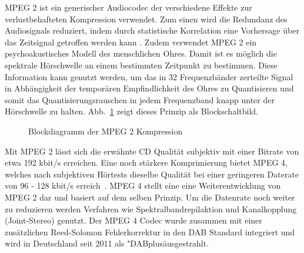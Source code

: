 \ac{MPEG 2} ist ein generischer Audiocodec der verschiedene Effekte zur verlustbehafteten Kompression verwendet. Zum einen wird die Redundanz des Audiosignals reduziert, indem durch statistische Korrelation eine Vorhersage über das Zeitsignal getroffen werden kann \cite{dab_buch}. Zudem verwendet \ac{MPEG 2} ein psychoakustisches Modell des menschlichen Ohres. Damit ist es möglich die spektrale Hörschwelle an einem bestimmten Zeitpunkt zu bestimmen. Diese Information kann genutzt werden, um das in 32 Frequenzbänder zerteilte Signal in Abhängigkeit der temporären Empfindlichkeit des Ohres zu Quantisieren und somit das Quantisierungsrauschen in jedem Frequenzband knapp unter der Hörschwelle zu halten. Abb.~\ref{chart:MPEG} zeigt dieses Prinzip als Blockschaltbild. 
\\
\begin{figure} [h]
\begin{center}
\caption{Blockdiagramm der MPEG 2 Kompression}
\label{chart:MPEG}
\end{center}
\end{figure}

Mit \ac{MPEG 2} lässt sich die erwähnte CD Qualität subjektiv mit einer Bitrate von etwa 192 kbit/s erreichen. Eine noch stärkere Komprimierung bietet \ac{MPEG 4}, welches nach subjektiven Hörtests dieselbe Qualität bei einer geringeren Daterate von 96 - 128 kbit/s erreich~\cite{mpeg:audio_tests}. \ac{MPEG 4} stellt eine eine Weiterentwicklung von \ac{MPEG 2} dar und basiert auf dem selben Prinzip. Um die Datenrate noch weiter zu reduzieren werden Verfahren wie Spektralbandrepilaktion und Kanalkopplung (Joint-Stereo) genutzt. Der \ac{MPEG 4} Codec wurde zusammen mit einer zusätzlichen Reed-Solomon Fehlerkorrektur in den DAB Standard integriert und wird in Deutschland seit 2011 als "DABplus\" ausgestrahlt. 

